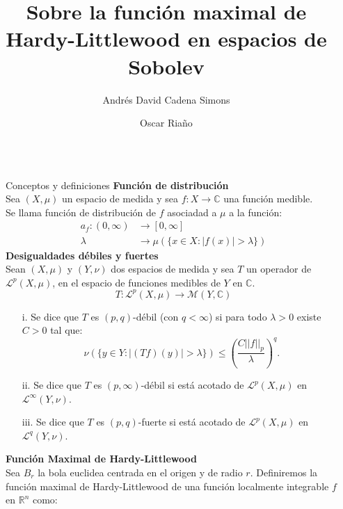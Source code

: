 \documentclass[final]{beamer}
\title{Sobre la función maximal de Hardy-Littlewood en espacios de Sobolev}
\author{Andrés David Cadena Simons \and Oscar Riaño}
\institute[shortinst]{Semillero de Análisis Armónico y Ecuaciones Diferenciales Parciales, Departamento de Matemáticas, Universidad Nacional de Colombia}
\newlength{\sepwidth}
\newlength{\colwidth}
\newcommand{\separatorcolumn}{\begin{column}{\sepwidth}\end{column}}
\begin{document}

\begin{frame}[t]
\begin{columns}[t]
\separatorcolumn

\begin{column}{\colwidth}

  \begin{block}{Conceptos y definiciones}
    \textbf{Función de distribución}\\
		  Sea $(X,\mu)$ un espacio de medida y sea $f:X\rightarrow \mathbb{C}$ una función medible.\\
			Se llama función de distribución de $f$ asociadad a $\mu$ a la función:
			\begin{align*}
				a_f:(0,\infty)&\rightarrow [0,\infty]\\
				\lambda&\rightarrow \mu(\{x\in X: |f(x)|>\lambda\})	
				\end{align*}
    \textbf{Desigualdades débiles y fuertes}\\
			Sean $(X,\mu)$ y $(Y, \nu)$ dos espacios de medida y sea $T$ un operador de $\mathcal{L}^{p}(X,\mu)$, en el espacio de funciones medibles de $Y$ en $\mathbb{C}$.
			$$T:\mathcal{L}^p(X,\mu)\rightarrow\mathcal{M}(Y,\mathbb{C})$$
			\begin{itemize}
				\item[i.] Se dice que $T$ es $(p,q)$-débil (con $q<\infty$) si para todo $\lambda>0$ existe $C>0$ tal que:
				  $$\nu(\{y\in Y:|(Tf)(y)|>\lambda\})\leq \left(\frac{C||f||_p}{\lambda}\right)^q.$$
				\item[ii.] Se dice que $T$ es $(p,\infty)$-débil si está acotado de $\mathcal{L}^p(X,\mu)$ en $\mathcal{L}^{\infty}(Y,\nu)$.
				\item[iii.] Se dice que $T$ es $(p,q)$-fuerte si está acotado de $\mathcal{L}^p(X,\mu)$ en $\mathcal{L}^q(Y,\nu)$.
			\end{itemize}				
 		\textbf{Función Maximal de Hardy-Littlewood}\\
			Sea $B_r$ la bola euclidea centrada en el origen y de radio $r$. Definiremos la función maximal de Hardy-Littlewood de una función localmente integrable $f$ en $\mathbb{R}^n$ como:

\end{block}
\end{column}
\end{columns}
\end{frame}
\end{document}
